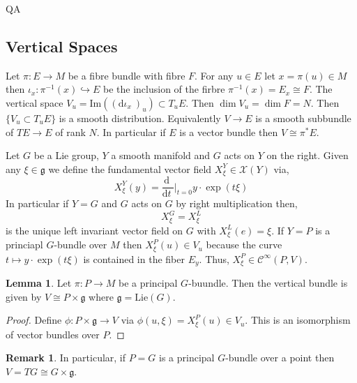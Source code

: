 QA	 \documentclass[12pt]{extarticle}
\renewcommand{\Im}[1]{\mathrm{Im}(#1)}
\renewcommand{\d}[1]{ \mathrm{d}#1 \:}
\newcommand{\deriv}[2]{\frac{\d{#1}}{\d{#2}}}
\theoremstyle{definition}
\newtheorem{lemma}[theorem]{Lemma}
\newtheorem{remark}{Remark}
\newenvironment{definition}[1][Definition:]{\begin{trivlist}
\item[\hskip \labelsep {\bfseries #1}]}{\end{trivlist}}
\newcommand{\C}[1]{\mathcal{C}^{#1}}
\begin{document}
\subsection{Vertical Spaces}

\begin{definition}
Let $\pi : E \to M$ be a fibre bundle with fibre $F$. For any $u \in E$ let $x = \pi(u) \in M$ then $\iota_x : \pi^{-1}(x) \hookrightarrow E$ be the inclusion of the firbre $\pi^{-1}(x) = E_x \cong F$. The vertical space $V_u = \Im{(\d{\iota_x})_u} \subset T_u E$. Then $\dim{V_u} = \dim{F} = N$. Then $\{ V_u \subset T_u E \}$ is a smooth distribution. Equivalently $V \to E$ is a smooth subbundle of $TE \to E$ of rank $N$. In particular if $E$ is a vector bundle then $V \cong \pi^* E$.  
\end{definition}

\newcommand{\g}{\mathfrak{g}}
\newcommand{\Lie}{\mathrm{Lie}}
\renewcommand{\C}[1]{\mathcal{C}^{#1}}

\begin{definition}
Let $G$ be a Lie group, $Y$ a smooth manifold and $G$ acts on $Y$ on the right. Given any $\xi \in \g$ we define the fundamental vector field $X^Y_\xi \in \mathscr{X}(Y)$ via,
\[ X^Y_{\xi}(y) = \deriv{}{t} \bigg|_{t = 0} y \cdot \exp(t \xi) \]
In particular if $Y = G$ and $G$ acts on $G$ by right multiplication then,
\[ X^G_{\xi} = X^L_{\xi} \]
is the unique left invariant vector field on $G$ with $X^L_\xi(e) = \xi$. If $Y = P$ is a princiapl $G$-bundle over $M$ then $X^P_\xi(u) \in V_u$ because the curve $t \mapsto y \cdot \exp(t\xi)$ is contained in the fiber $E_y$. Thus, $X^P_\xi \in \C{\infty}(P, V)$. 
\end{definition}

\begin{lemma}
Let $\pi : P \to M$ be a principal $G$-buundle. Then the vertical bundle is given by $V \cong P \times \g$ where $\g = \Lie(G)$. 
\end{lemma}

\begin{proof}
Define $\phi : P \times \g \to V$ via $\phi(u, \xi) = X^P_\xi(u) \in V_u$. This is an isomorphism of vector bundles over $P$.
\end{proof}

\begin{remark}
In particular, if $P = G$ is a principal $G$-bundle over a point then $V = TG \cong G \times \g$. 
\end{remark}

\newcommand{\Ad}{\mathrm{Ad}}
\end{document}
